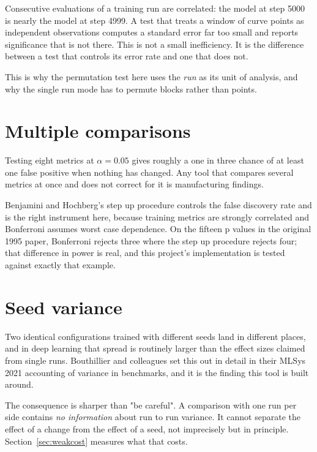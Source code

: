 \documentclass[11pt,a4paper]{report}
\begin{document}
Consecutive evaluations of a training run are correlated: the model at step 5000
is nearly the model at step 4999. A test that treats a window of curve points as
independent observations computes a standard error far too small and reports
significance that is not there. This is not a small inefficiency. It is the
difference between a test that controls its error rate and one that does not.

This is why the permutation test here uses the \emph{run} as its unit of
analysis, and why the single run mode has to permute blocks rather than points.

\section{Multiple comparisons}

Testing eight metrics at $\alpha = 0.05$ gives roughly a one in three chance of at
least one false positive when nothing has changed. Any tool that compares several
metrics at once and does not correct for it is manufacturing findings.

Benjamini and Hochberg's step up procedure controls the false discovery rate and
is the right instrument here, because training metrics are strongly correlated
and Bonferroni assumes worst case dependence. On the fifteen p values in the
original 1995 paper, Bonferroni rejects three where the step up procedure rejects
four; that difference in power is real, and this project's implementation is
tested against exactly that example.

\section{Seed variance}

Two identical configurations trained with different seeds land in different
places, and in deep learning that spread is routinely larger than the effect
sizes claimed from single runs. Bouthillier and colleagues set this out in detail
in their MLSys 2021 accounting of variance in benchmarks, and it is the finding
this tool is built around.

The consequence is sharper than "be careful". A comparison with one run per side
contains \emph{no information} about run to run variance. It cannot separate the
effect of a change from the effect of a seed, not imprecisely but in principle.
Section~\ref{sec:weakcost} measures what that costs.

\end{document}
